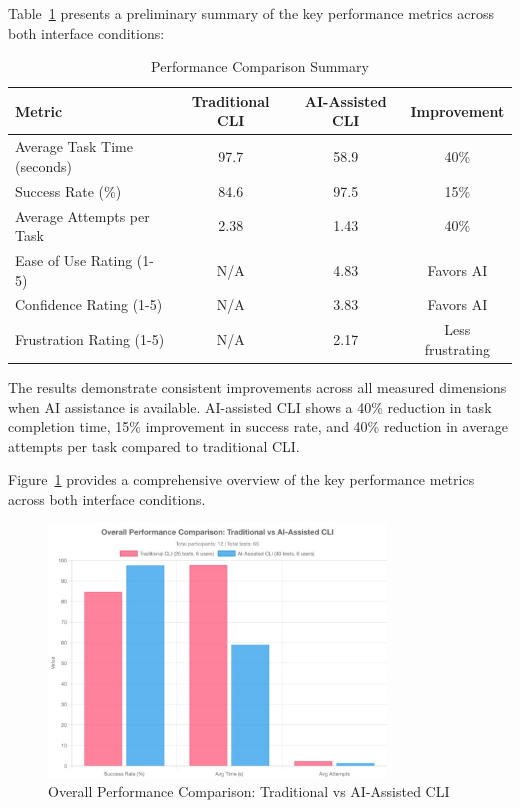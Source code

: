 Table~\ref{tab:results_summary} presents a preliminary summary of the key performance metrics across both interface conditions:

\begin{table}[h]
	\centering
	\caption{Performance Comparison Summary}
	\label{tab:results_summary}
	\begin{tabular}{|l|c|c|c|}
		\hline
		\textbf{Metric}             & \textbf{Traditional CLI} & \textbf{AI-Assisted CLI} & \textbf{Improvement} \\
		\hline
		Average Task Time (seconds) & 97.7                     & 58.9                     & 40\%                 \\
		\hline
		Success Rate (\%)           & 84.6                     & 97.5                     & 15\%                 \\
		\hline
		Average Attempts per Task   & 2.38                     & 1.43                     & 40\%                 \\
		\hline
		Ease of Use Rating (1-5)    & N/A                      & 4.83                     & Favors AI            \\
		\hline
		Confidence Rating (1-5)     & N/A                      & 3.83                     & Favors AI            \\
		\hline
		Frustration Rating (1-5)    & N/A                      & 2.17                     & Less frustrating     \\
		\hline
	\end{tabular}
\end{table}

The results demonstrate consistent improvements across all measured dimensions when AI assistance is available. AI-assisted CLI shows a 40\% reduction in task completion time, 15\% improvement in success rate, and 40\% reduction in average attempts per task compared to traditional CLI.

Figure~\ref{fig:performance_comparison} provides a comprehensive overview of the key performance metrics across both interface conditions.

\begin{figure}[h]
	\centering
	\includegraphics[width=0.8\textwidth]{assets/figures/performance_comparison.pdf}
	\caption{Overall Performance Comparison: Traditional vs AI-Assisted CLI}
	\label{fig:performance_comparison}
\end{figure}

